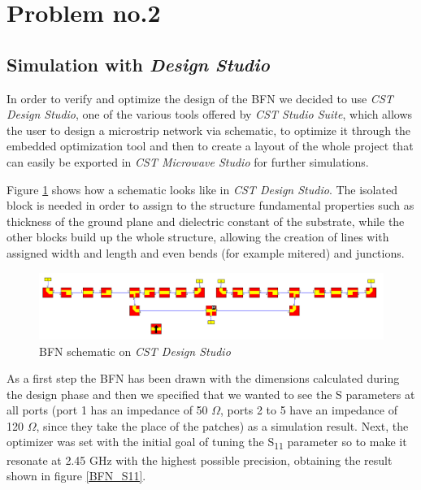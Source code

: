 \section{Problem no.2}

\subsection{Simulation with \textit{Design Studio}}

In order to verify and optimize the design of the BFN we decided to use \textit{CST Design Studio}, one of the various tools offered by \textit{CST Studio Suite}, which allows the user to design a microstrip network via schematic, to optimize it through the embedded optimization tool and then to create a layout of the whole project that can easily be exported in \textit{CST Microwave Studio} for further simulations.

\par\medskip
\noindent
Figure \ref{BFN_schematic} shows how a schematic looks like in \textit{CST Design Studio}. The isolated block is needed in order to assign to the structure fundamental properties such as thickness of the ground plane and dielectric constant of the substrate, while the other blocks build up the whole structure, allowing the creation of lines with assigned width and length and even bends (for example mitered) and junctions.

\begin{figure}[H]
\centering
\includegraphics[scale=0.4]{BFN_schematic.png}
\caption{BFN schematic on \textit{CST Design Studio}}
\label{BFN_schematic}
\end{figure}

\par\medskip
\noindent
As a first step the BFN has been drawn with the dimensions calculated during the design phase and then we specified that we wanted to see the S parameters at all ports (port 1 has an impedance of 50 $\Omega$, ports 2 to 5 have an impedance of 120 $\Omega$, since they take the place of the patches) as a simulation result. Next, the optimizer was set with the initial goal of tuning the S\textsubscript{11} parameter so to make it resonate at 2.45 GHz with the highest possible precision, obtaining the result shown in figure \ref{BFN_S11}.

